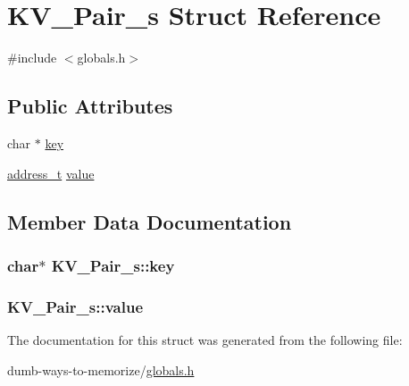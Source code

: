 \hypertarget{struct_k_v___pair__s}{}\section{K\+V\+\_\+\+Pair\+\_\+s Struct Reference}
\label{struct_k_v___pair__s}


{\ttfamily \#include $<$globals.\+h$>$}

\subsection*{Public Attributes}
\begin{DoxyCompactItemize}
\item 
char $\ast$ \hyperlink{struct_k_v___pair__s_a0fd8885c774f551974122eb7c08be944}{key}
\item 
\hyperlink{globals_8h_a2bc144218f3051b70834068a1d309e58}{address\+\_\+t} \hyperlink{struct_k_v___pair__s_a7f74f5fd313fc839e52254f378da85f1}{value}
\end{DoxyCompactItemize}


\subsection{Member Data Documentation}
\subsubsection[{\texorpdfstring{key}{key}}]{\setlength{\rightskip}{0pt plus 5cm}char$\ast$ K\+V\+\_\+\+Pair\+\_\+s\+::key}\hypertarget{struct_k_v___pair__s_a0fd8885c774f551974122eb7c08be944}{}\label{struct_k_v___pair__s_a0fd8885c774f551974122eb7c08be944}
\subsubsection[{\texorpdfstring{value}{value}}]{ K\+V\+\_\+\+Pair\+\_\+s\+::value}\hypertarget{struct_k_v___pair__s_a7f74f5fd313fc839e52254f378da85f1}{}\label{struct_k_v___pair__s_a7f74f5fd313fc839e52254f378da85f1}


The documentation for this struct was generated from the following file\+:\begin{DoxyCompactItemize}
\item 
dumb-\/ways-\/to-\/memorize/\hyperlink{globals_8h}{globals.\+h}\end{DoxyCompactItemize}
